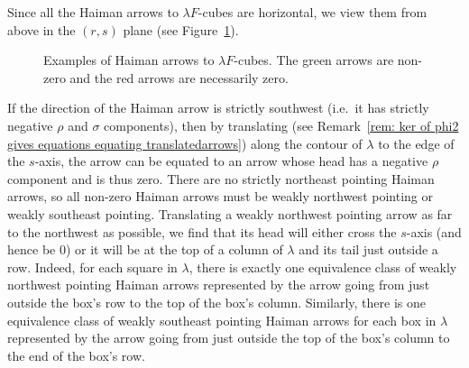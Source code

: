 \documentclass[12pt]{amsart}
\theoremstyle{definition}
\begin{document}
Since all the Haiman arrows to $\lambda F$-cubes are horizontal, we
view them from above in the $(r,s)$ plane (see Figure~\ref{fig: Haiman arrows
to F-cubes}).

\begin{figure}
\caption{Examples of Haiman arrows to $\lambda F$-cubes. The green
arrows are non-zero and the red arrows are necessarily zero.}\label{fig: Haiman arrows
to F-cubes}
\end{figure}

If the direction of the Haiman arrow is strictly southwest (i.e.~it
has strictly negative $\rho$ and $\sigma$ components), then by
translating (see Remark~\ref{rem: ker of phi2 gives equations equating
translatedarrows}) along the contour of $\lambda$ to the edge of the
$s$-axis, the arrow can be equated to an arrow whose head has a
negative $\rho$ component and is thus zero. There are no strictly
northeast pointing Haiman arrows, so all non-zero Haiman arrows must
be weakly northwest pointing or weakly southeast pointing. Translating
a weakly northwest pointing arrow as far to the northwest as possible,
we find that its head will either cross the $s$-axis (and hence be 0)
or it will be at the top of a column of $\lambda$ and its tail just
outside a row. Indeed, for each square in $\lambda $, there is exactly
one equivalence class of weakly northwest pointing Haiman arrows
represented by the arrow going from just outside the box's row to the
top of the box's column. Similarly, there is one equivalence class of
weakly southeast pointing Haiman arrows for each box in $\lambda$
represented by the arrow going from just outside the top of the
box's column to the end of the box's row.
\end{document}
